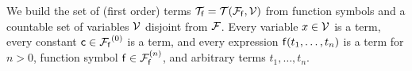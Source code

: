 
\begin{definition}\label{def:terms}
	We build the set of (first order) {\myem terms }${\mathcal T}_{\mathsf f} = {{\mathcal T}({\mathcal F}_{\mathsf f},{\mathcal V})}$ 
	from function symbols and a
	countable set of {\myem variables }${\mathcal V}$ disjoint from ${\mathcal F}$\!.
	Every variable $x\in{\mathcal V}$ is a term,
	every {\myem constant} ${\mathsf c}\in{{\mathcal F}_{\mathsf f}}^{(0)}$ is a term, 
	and every expression ${\mathsf f}(t_1,\ldots,t_n)$ is a term
	for $n>0$, function symbol ${\mathsf f}\in{{\mathcal F}^{(n)}_{\mathsf f}}$,  
	and arbitrary terms $t_1,\ldots,t_n$.
\end{definition}

